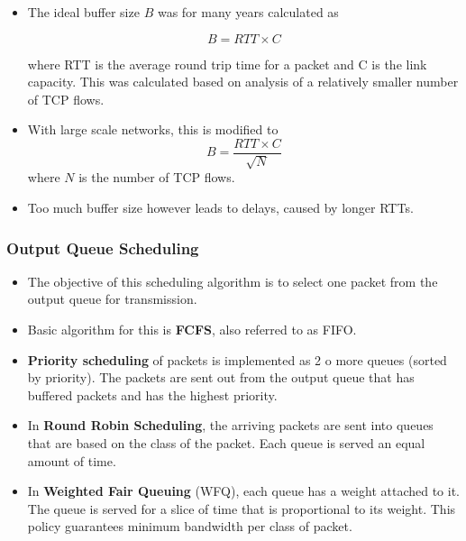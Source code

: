 \documentclass[a4paper]{article}
\theoremstyle{plain}
\theoremstyle{definition}
\begin{document}
\begin{itemize}
    \item The ideal buffer size $B$ was for many years calculated as 
    
    \begin{equation}
        B = RTT \times C
    \end{equation}
    
    where RTT is the average round trip time for a packet and C is the link capacity. This was calculated based on analysis of a relatively smaller number of TCP flows.
    
    \item With large scale networks, this is modified to
    \begin{equation}
        B = \frac{RTT \times C}{\sqrt{N}}
    \end{equation}
    where $N$ is the number of TCP flows. 
    
    \item Too much buffer size however leads to delays, caused by longer RTTs. 
\end{itemize}

\subsubsection{Output Queue Scheduling}
\begin{itemize}
    \item The objective of this scheduling algorithm is to select one packet from the output queue for transmission. 
    
    \item Basic algorithm for this is \textbf{FCFS}, also referred to as FIFO. 
    
    \item \textbf{Priority scheduling} of packets is implemented as 2 o more queues (sorted by priority). The packets are sent out from the output queue that has buffered packets and has the highest priority. 
    
    \item In \textbf{Round Robin Scheduling}, the arriving packets are sent into queues that are based on the class of the packet. Each queue is served an equal amount of time. 
    
    \item In \textbf{Weighted Fair Queuing} (WFQ), each queue has a weight attached to it. The queue is served for a slice of time that is proportional to its weight. This policy guarantees minimum bandwidth per class of packet. 
\end{itemize}
\end{document}
